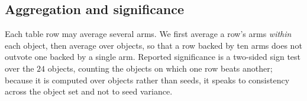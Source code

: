 \subsection{Aggregation and significance}

Each table row may average several arms. We first average a row's arms
\emph{within} each object, then average over objects, so that a row backed by ten arms
does not outvote one backed by a single arm. Reported significance is a two-sided sign
test over the $24$ objects, counting the objects on which one row beats another;
because it is computed over objects rather than seeds, it speaks to consistency across
the object set and not to seed variance.
